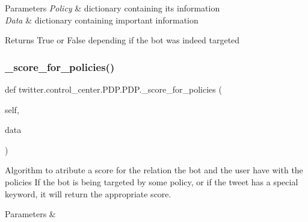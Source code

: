 \begin{DoxyParams}{Parameters}
{\em Policy} & dictionary containing its information \\
\hline
{\em Data} & dictionary containing important information\\
\hline
\end{DoxyParams}
\begin{DoxyReturn}{Returns}
True or False depending if the bot was indeed targeted 
\end{DoxyReturn}
\mbox{\label{classtwitter_1_1control__center_1_1PDP_1_1PDP_ab3d879dc9a07fad8632ec8db1ecc93c8}} 
\subsubsection{\texorpdfstring{\+\_\+score\+\_\+for\+\_\+policies()}{\_score\_for\_policies()}}
{\footnotesize\ttfamily def twitter.\+control\+\_\+center.\+P\+D\+P.\+P\+D\+P.\+\_\+score\+\_\+for\+\_\+policies (\begin{DoxyParamCaption}\item[{}]{self,  }\item[{}]{data }\end{DoxyParamCaption})\hspace{0.3cm}{\ttfamily [private]}}



Algorithm to atribute a score for the relation the bot and the user have with the policies If the bot is being targeted by some policy, or if the tweet has a special keyword, it will return the appropriate score. 


\begin{DoxyParams}{Parameters}
{\em } & \\
\hline
\end{DoxyParams}
\mbox{\label{classtwitter_1_1control__center_1_1PDP_1_1PDP_ab958d1ecb98242eace6e2b55f61fefa2}} 
